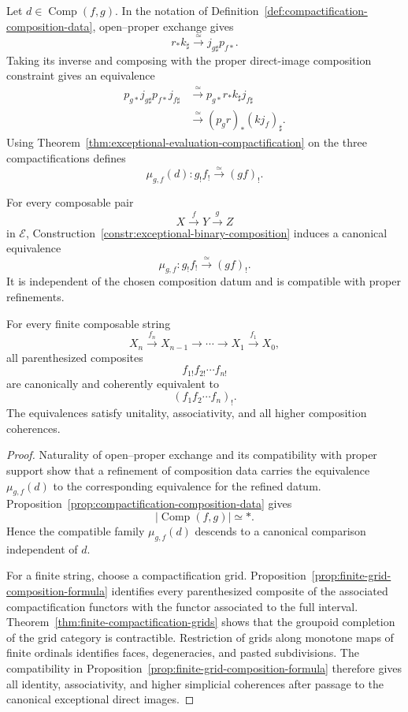 \begin{construction}
\label{constr:exceptional-binary-composition}
Let \(d\in\operatorname{Comp}(f,g)\).  In the notation of
Definition~\ref{def:compactification-composition-data}, open--proper
exchange gives
\[
    r_*k_\sharp
    \xrightarrow{\simeq}
    j_{g\sharp}p_{f*}.
\]
Taking its inverse and composing with the proper direct-image composition
constraint gives an equivalence
\[
\begin{aligned}
    p_{g*}j_{g\sharp}p_{f*}j_{f\sharp}
    &\xrightarrow{\simeq}
    p_{g*}r_*k_\sharp j_{f\sharp} \\
    &\xrightarrow{\simeq}
    (p_gr)_*(kj_f)_\sharp.
\end{aligned}
\]
Using Theorem~\ref{thm:exceptional-evaluation-compactification} on the three
compactifications defines
\[
    \mu_{g,f}(d):
    g_!f_!
    \xrightarrow{\simeq}
    (gf)_!.
\]
\end{construction}

\begin{theorem}
\label{thm:exceptional-composition}
For every composable pair
\[
    X\xrightarrow{f}Y\xrightarrow{g}Z
\]
in \(\mathcal E\), Construction~\ref{constr:exceptional-binary-composition}
induces a canonical equivalence
\[
    \mu_{g,f}:
    g_!f_!
    \xrightarrow{\simeq}
    (gf)_!.
\]
It is independent of the chosen composition datum and is compatible with
proper refinements.

For every finite composable string
\[
    X_n\xrightarrow{f_n}X_{n-1}
    \longrightarrow\cdots\longrightarrow
    X_1\xrightarrow{f_1}X_0,
\]
all parenthesized composites
\[
    f_{1!}f_{2!}\cdots f_{n!}
\]
are canonically and coherently equivalent to
\[
    (f_1f_2\cdots f_n)_!.
\]
The equivalences satisfy unitality, associativity, and all higher
composition coherences.
\end{theorem}

\begin{proof}
Naturality of open--proper exchange and its compatibility with proper
support show that a refinement of composition data carries the equivalence
\(\mu_{g,f}(d)\) to the corresponding equivalence for the refined datum.
Proposition~\ref{prop:compactification-composition-data} gives
\[
    \bigl|\operatorname{Comp}(f,g)\bigr|
    \simeq
    *.
\]
Hence the compatible family \(\mu_{g,f}(d)\) descends to a canonical
comparison independent of \(d\).

For a finite string, choose a compactification grid.  Proposition~\ref{prop:finite-grid-composition-formula}
identifies every parenthesized composite of the associated compactification
functors with the functor associated to the full interval.  Theorem~\ref{thm:finite-compactification-grids}
shows that the groupoid completion of the grid category is contractible.
Restriction of grids along monotone maps of finite ordinals identifies
faces, degeneracies, and pasted subdivisions.  The compatibility in
Proposition~\ref{prop:finite-grid-composition-formula} therefore gives all
identity, associativity, and higher simplicial coherences after passage to
the canonical exceptional direct images.
\end{proof}

